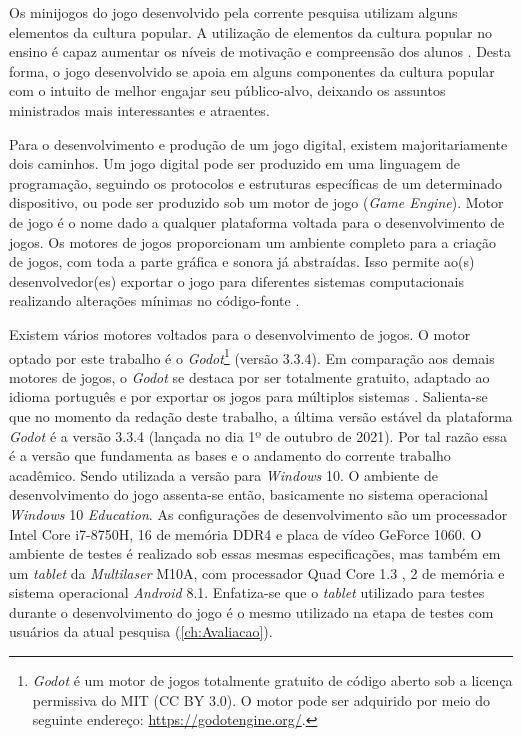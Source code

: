Os minijogos do jogo desenvolvido pela corrente pesquisa utilizam alguns elementos da cultura popular. A utilização de elementos da cultura popular no ensino é capaz aumentar os níveis de motivação e compreensão dos alunos \cite{giroux1988schooling, cheung2001use, duncan2004your, chik2011learner}. Desta forma, o jogo desenvolvido se apoia em alguns componentes da cultura popular com o intuito de melhor engajar seu público-alvo, deixando os assuntos ministrados mais interessantes e atraentes. 

Para o desenvolvimento e produção de um jogo digital, existem majoritariamente dois caminhos. Um jogo digital pode ser produzido em uma linguagem de programação, seguindo os protocolos e estruturas específicas de um determinado dispositivo, ou pode ser produzido sob um motor de jogo (\textit{Game Engine}). Motor de jogo é o nome dado a qualquer plataforma voltada para o desenvolvimento de jogos. Os motores de jogos proporcionam um ambiente completo para a criação de jogos, com toda a parte gráfica e sonora já abstraídas. Isso permite ao(s) desenvolvedor(es) exportar o jogo para diferentes sistemas computacionais realizando alterações mínimas no código-fonte \cite{bishop1998designing, machado2009serious}.

Existem vários motores voltados para o desenvolvimento de jogos. O motor optado por este trabalho é o \textit{Godot}\footnote{\textit{Godot} é um motor de jogos totalmente gratuito de código aberto sob a licença permissiva do MIT (CC BY 3.0). O motor pode ser adquirido por meio do seguinte endereço: \url{https://godotengine.org/}.} (versão 3.3.4). Em comparação aos demais motores de jogos, o \textit{Godot} se destaca por ser totalmente gratuito, adaptado ao idioma português e por exportar os jogos para múltiplos sistemas \cite{scherer2020analise}. Salienta-se que no momento da redação deste trabalho, a última versão estável da plataforma \textit{Godot} é a versão 3.3.4 (lançada no dia 1º de outubro de 2021). Por tal razão essa é a versão que fundamenta as bases e o andamento do corrente trabalho acadêmico. Sendo utilizada a versão para \textit{Windows} 10. O ambiente de desenvolvimento do jogo assenta-se então, basicamente no sistema operacional \textit{Windows} 10 \textit{Education}. As configurações de desenvolvimento são um processador Intel\textregistered\textbf{ }Core\texttrademark\textbf{ }i7-8750H, 16  de memória  DDR4 e placa de vídeo GeForce  1060. O ambiente de testes é realizado sob essas mesmas especificações, mas também em um \textit{tablet} da \textit{Multilaser} M10A, com processador Quad Core 1.3 , 2  de memória  e sistema operacional \textit{Android} 8.1. Enfatiza-se que o \textit{tablet} utilizado para testes durante o desenvolvimento do jogo é o mesmo utilizado na etapa de testes com usuários da atual pesquisa (\autoref{ch:Avaliacao}).

